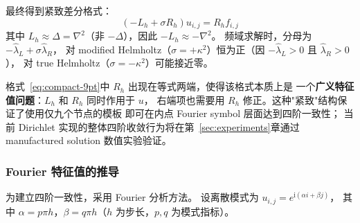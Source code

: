 最终得到紧致差分格式：
\begin{equation}
  (-L_h + \sigma R_h)u_{i,j} = R_h f_{i,j}
  \label{eq:compact-9pt}
\end{equation}
其中 $L_h \approx \Delta = \nabla^2$（非 $-\Delta$），因此 $-L_h \approx -\nabla^2$。
频域求解时，分母为 $-\hat{\lambda}_L + \sigma\hat{\lambda}_R$，
对 modified Helmholtz（$\sigma=+\kappa^2$）恒为正（因 $-\hat{\lambda}_L > 0$ 且 $\hat{\lambda}_R > 0$），
对 true Helmholtz（$\sigma=-\kappa^2$）可能接近零。

\begin{remark}
  格式~\eqref{eq:compact-9pt}中 $R_h$ 出现在等式两端，使得该格式本质上是
  一个\textbf{广义特征值问题}：$L_h$ 和 $R_h$ 同时作用于 $u$，
  右端项也需要用 $R_h$ 修正。这种"紧致"结构保证了使用仅九个节点的模板
  即可在内点 Fourier symbol 层面达到四阶一致性；
  当前 Dirichlet 实现的整体四阶收敛行为将在第~\ref{sec:experiments}章通过 manufactured solution 数值实验验证。
\end{remark}

\subsubsection{Fourier 特征值的推导}

为建立四阶一致性，采用 Fourier 分析方法。
设离散模式为 $u_{i,j} = e^{\mathrm{i}(\alpha i + \beta j)}$，
其中 $\alpha = p\pi h$，$\beta = q\pi h$（$h$ 为步长，$p,q$ 为模式指标）。

